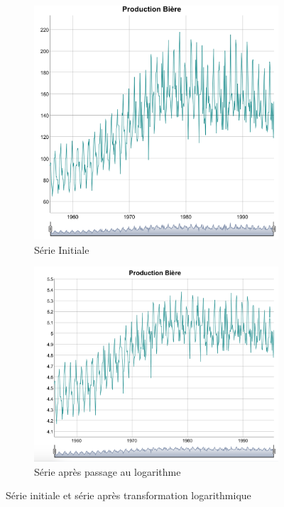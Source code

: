\documentclass[12pt,a4paper]{book}
\newcommand{\1}{\mathds{1}}
\begin{document}
\begin{figure}[h]
\centering
	\begin{subfigure}{.4\textwidth}
    	\includegraphics[width=\textwidth]{plot_beer}  
    	\caption{Série Initiale}
    	\label{fig:sub1}
    \end{subfigure}
    \begin{subfigure}{.4\textwidth}
    	\includegraphics[width=\textwidth]{plot_log_beer}  
    	\caption{Série après passage au logarithme}
    	\label{fig:sub2}
    \end{subfigure}

\caption{Série initiale et série après transformation logarithmique}
\label{fig:1}
\end{figure}
\end{document}
